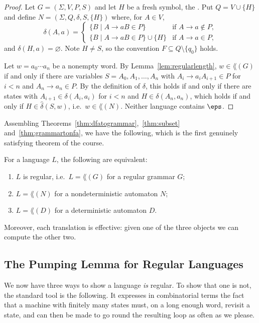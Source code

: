 \begin{proof}
	Let $G = (\Sigma, V, P, S)$ and let $H$ be a fresh symbol, the . Put $Q = V \cup \{H\}$ and define $N = (\Sigma, Q, \delta, S, \{H\})$ where, for $A \in V$,
	$$\delta(A, a) = \begin{cases} \{B \mid A \to aB \in P\} & \text{if } A \to a \notin P, \\ \{B \mid A \to aB \in P\} \cup \{H\} & \text{if } A \to a \in P,\end{cases}$$
	and $\delta(H,a) = \varnothing$. Note $H \neq S$, so the convention $F \subseteq Q \setminus \{q_0\}$ holds.

	Let $w = a_0\cdots a_n$ be a nonempty word. By Lemma~\ref{lem:regularlength}, $w \in \lang(G)$ if and only if there are variables $S = A_0, A_1, \dots, A_n$ with $A_i \to a_iA_{i+1} \in P$ for $i < n$ and $A_n \to a_n \in P$. By the definition of $\delta$, this holds if and only if there are states with $A_{i+1} \in \delta(A_i, a_i)$ for $i < n$ and $H \in \delta(A_n, a_n)$, which holds if and only if $H \in \hat\delta(S, w)$, i.e.\ $w \in \lang(N)$. Neither language contains $\eps$.
\end{proof}

Assembling Theorems~\ref{thm:dfatogrammar},~\ref{thm:subset} and~\ref{thm:grammartonfa}, we have the following, which is the first genuinely satisfying theorem of the course.

\begin{corollary}\label{cor:threeequiv}
	For a language $L$, the following are equivalent:
	\begin{enumerate}[label=(\roman*)]
		\item $L$ is regular, i.e.\ $L = \lang(G)$ for a regular grammar $G$;
		\item $L = \lang(N)$ for a nondeterministic automaton $N$;
		\item $L = \lang(D)$ for a deterministic automaton $D$.
	\end{enumerate}
	Moreover, each translation is effective: given one of the three objects we can compute the other two.
\end{corollary}

\subsection{The Pumping Lemma for Regular Languages}

We now have three ways to show a language \emph{is} regular. To show that one is not, the standard tool is the following. It expresses in combinatorial terms the fact that a machine with finitely many states must, on a long enough word, revisit a state, and can then be made to go round the resulting loop as often as we please.

